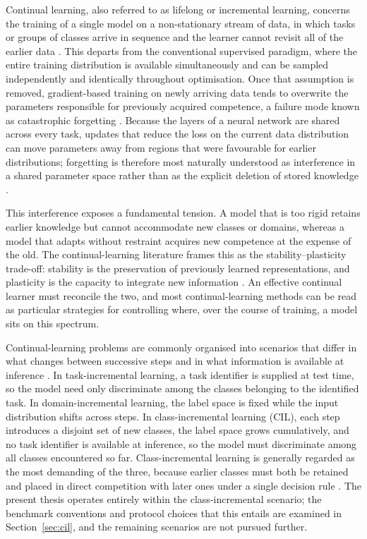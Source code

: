 Continual learning, also referred to as lifelong or incremental learning,
concerns the training of a single model on a non-stationary stream of data,
in which tasks or groups of classes arrive in sequence and the learner
cannot revisit all of the earlier data \parencite{delange2022continual}. This
departs from the conventional supervised paradigm, where the entire
training distribution is available simultaneously and can be sampled
independently and identically throughout optimisation. Once that assumption
is removed, gradient-based training on newly arriving data tends to
overwrite the parameters responsible for previously acquired competence, a
failure mode known as catastrophic forgetting \parencite{kirkpatrick2017overcoming}.
Because the layers of a neural network are shared across every task,
updates that reduce the loss on the current data distribution can move
parameters away from regions that were favourable for earlier
distributions; forgetting is therefore most naturally understood as
interference in a shared parameter space rather than as the explicit
deletion of stored knowledge \parencite{kirkpatrick2017overcoming,delange2022continual}.

This interference exposes a fundamental tension. A model that is too rigid
retains earlier knowledge but cannot accommodate new classes or domains,
whereas a model that adapts without restraint acquires new competence at
the expense of the old. The continual-learning literature frames this as
the stability--plasticity trade-off: stability is the preservation of
previously learned representations, and plasticity is the capacity to
integrate new information \parencite{delange2022continual}. An effective continual
learner must reconcile the two, and most continual-learning methods can be
read as particular strategies for controlling where, over the course of
training, a model sits on this spectrum.

Continual-learning problems are commonly organised into scenarios that
differ in what changes between successive steps and in what information is
available at inference \parencite{masana2020classincremental,delange2022continual}. In
task-incremental learning, a task identifier is supplied at test time, so
the model need only discriminate among the classes belonging to the
identified task. In domain-incremental learning, the label space is fixed
while the input distribution shifts across steps. In class-incremental
learning (CIL), each step introduces a disjoint set of new classes, the
label space grows cumulatively, and no task identifier is available at
inference, so the model must discriminate among all classes encountered so
far. Class-incremental learning is generally regarded as the most demanding
of the three, because earlier classes must both be retained and placed in
direct competition with later ones under a single decision rule \parencite{masana2020classincremental}.
The present thesis operates entirely within the
class-incremental scenario; the benchmark conventions and protocol choices
that this entails are examined in Section~\ref{sec:cil}, and the remaining scenarios
are not pursued further.

